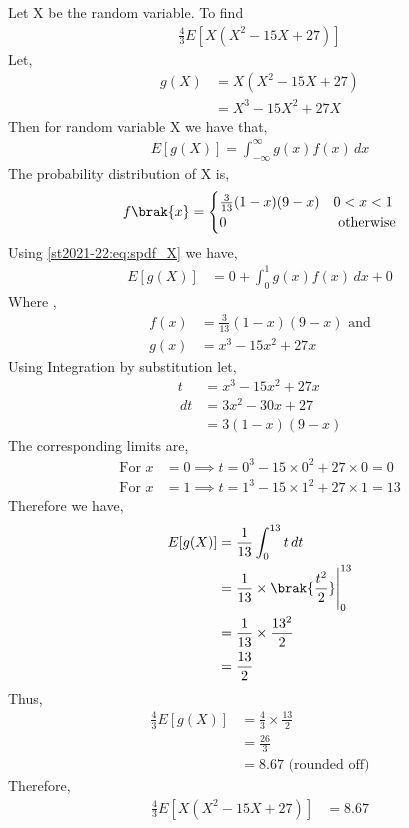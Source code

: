 
Let X be the random variable. To find 
\begin{align}
    \frac{4}{3} E[X(X^2 -15X + 27)]
\end{align}
Let,
\begin{align}
    g(X) &= X(X^2 -15X + 27)  \\
         &= X^3 -15X^2 + 27X
\end{align}
Then for random variable X we have that,
\begin{align}
    E[g(X)] = \int_{-\infty}^{\infty} g(x)f(x) \,dx
\end{align}
The probability distribution of X is,
\begin{align}
\label{st2021-22:eq:spdf_X}
f\brak{x} = 
\begin{cases}
\frac{3}{13}(1-x)(9-x) & 0 < x < 1
\\
0 & \text{ otherwise}
\end{cases}
\end{align}
Using \ref{st2021-22:eq:spdf_X} we have,
\begin{align}
    E[g(X)] &= 0 +\int_{0}^{1} g(x)f(x) \,dx + 0
\end{align}
Where ,
\begin{align}
    f(x ) &= \frac{3}{13}(1-x)(9-x) \text{ and}  \\
    g(x) &= x^3 -15x^2 + 27x
\end{align}
Using Integration by substitution let,
\begin{align*}
    t &= x^3 - 15x^2 + 27x \\
    \,dt &= 3x^2 - 30x + 27 \\
         &= 3(1-x)(9-x)
\end{align*}
The corresponding limits are,
\begin{align}
    \text{For } x &=0  \implies t = 0^3 -15\times 0^2 + 27 \times 0 = 0 \\
        \text{For } x &=1  \implies t = 1^3 -15\times 1^2 + 27 \times 1 = 13
\end{align}
Therefore we have,
\begin{align}
    E[g(X)] &= \frac{1}{13} \int_{0}^{13} t \,dt \\
    & = \frac{1}{13} \times \brak{\frac{t^2}{2}}  \Biggr|_{0}^{13} \\
    &= \frac{1}{13} \times \frac{13^2}{2} \\
    & = \frac{13}{2} 
\end{align}
Thus, 
\begin{align}
    \frac{4}{3} E[g(X)] & =  \frac{4}{3} \times \frac{13}{2} \\
    &= \frac{26}{3} \\
    &= 8.67  \text{ (rounded off)}
\end{align}
Therefore,
\begin{align}
    \frac{4}{3} E[X(X^2 -15X + 27)] & =  8.67
\end{align}